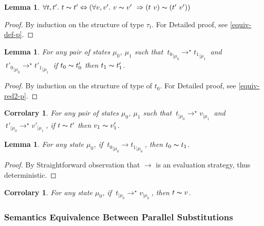 \documentclass[a4paper,11pt,oneside]{article}
\theoremstyle{plain}
\newtheorem{lemma}[definition]{Lemma}
\newtheorem{corr}[definition]{Corrolary}
\newcommand{\tmapp}[2]{(#1 ~ #2)}
\newcommand{\ty}[1][]{\tau_{#1}}
\newcommand{\evalstep}[4]{~#1_{|\mu_#2} \rightarrow #3_{|\mu_#4} ~}
\newcommand{\evalstar}[4]{~#1_{|\mu_#2} \rightarrow^{\star} #3_{|\mu_#4} ~}
\newcommand{\eqv}[1]{#1 \thicksim #1'}
\begin{document}
	\begin{lemma}
		$\forall t,t'.~ \eqv{t} \Leftrightarrow 
			(\forall v, v'.~\eqv{v}~\Rightarrow
			\tmapp{t}{v} \thicksim \tmapp{t'}{v'})$
	\label{equiv-def-l}
	\end{lemma}
	
	\begin{proof} By induction on the structure of type $\ty[t]$.
	For Detailed proof, see \ref{equiv-def-p}.
	\end{proof}

	
	\begin{lemma}
		For any pair of states $\mu_0$, $\mu_1$ such that
		$\evalstar{{t_0}}{0}{{t_1}}{1}$ and $\evalstar{{t'_0}}{0}{{t'_1}}{1}$
		if $\eqv{t_0}$ then $\eqv{t_1}$.
		\label{equiv-red2-l}
	\end{lemma}
	
	\begin{proof}
		By induction on the structure of type of $t_0$. 
		For Detailed proof, see \ref{equiv-red2-p}.
	\end{proof}		

	\begin{corr} 
		For any pair of states $\mu_0$, $\mu_1$ such that
		$\evalstar{{t}}{0}{{v}}{1}$ and \mbox{$\evalstar{{t'}}{0}{{v'}}{1}$},
		if $\eqv{t}$ then $\eqv{v_1}$.
		\label{equivalence parallel preservation corr}
	\end{corr}
	
	
	
	\begin{lemma}
		For any state $\mu_0$, if $\evalstep{{t_0}}{0}{{t_1}}{0}$, then
		$t_0 \thicksim t_1$.
	\end{lemma}	
	\begin{proof}
		By Straightforward observation that $\rightarrow$ is an evaluation
		strategy, thus deterministic.
	\end{proof}		

	\begin{corr} 
		For any state $\mu_0$, if $\evalstar{{t}}{0}{{v}}{0}$, then		
		$t \thicksim v$.
	\end{corr}
\subsubsection*{Semantics Equivalence Between Parallel Substitutions}
\end{document}
